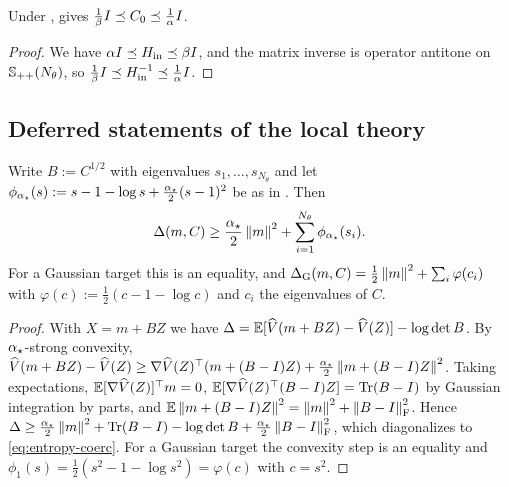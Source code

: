 \begin{lemma}\label{lem:rescue-band}
    Under ,  gives
    $\tfrac1\beta I\preceq C_0\preceq\tfrac1\alpha I$.
\end{lemma}

\begin{proof}
    We have $\alpha I\preceq H_{\mathrm{in}}\preceq\beta I$, and the matrix inverse is
    operator antitone on $\mathbb{S}_{++}(N_\theta)$, so
    $\tfrac1\beta I\preceq H_{\mathrm{in}}^{-1}\preceq\tfrac1\alpha I$.
\end{proof}

\subsection{Deferred statements of the local theory}

\begin{lemma}
\label{lem:coercivity}
Write $B:=C^{1/2}$ with eigenvalues $s_1,\dots,s_{N_\theta}$ and let
$\phi_{\alpha_\star}(s):=s-1-\log s+\tfrac{\alpha_\star}2(s-1)^2$ be as in . Then
\begin{equation}
\label{eq:entropy-coerc}
    \Delta(m,C)\geq\frac{\alpha_\star}2\left\lVert m\right\rVert^2+\sum_{i=1}^{N_\theta}\phi_{\alpha_\star}(s_i).
\end{equation}
For a Gaussian target this is an equality, and
$\Delta_{\mathrm G}(m,C)=\tfrac12\left\lVert m\right\rVert^2+\sum_i\varphi(c_i)$ with
$\varphi(c):=\tfrac12(c-1-\log c)$ and $c_i$ the eigenvalues of $C$.
\end{lemma}

\begin{proof}
With $X=m+BZ$ we have $\Delta=\mathbb{E}[\widehat V(m+BZ)-\widehat V(Z)]-\log\det B$. By
$\alpha_\star$-strong convexity,
$\widehat V(m+BZ)-\widehat V(Z)\geq\nabla\widehat V(Z)^\top(m+(B-I)Z)+\tfrac{\alpha_\star}2\left\lVert m+(B-I)Z\right\rVert^2$.
Taking expectations, $\mathbb{E}[\nabla\widehat V(Z)]^\top m=0$,
$\mathbb{E}[\nabla\widehat V(Z)^\top(B-I)Z]=\operatorname{Tr}(B-I)$ by Gaussian integration by parts, and
$\mathbb{E}\left\lVert m+(B-I)Z\right\rVert^2=\left\lVert m\right\rVert^2+\left\lVert B-I\right\rVert_{\mathrm{F}}^2$. Hence
$\Delta\geq\tfrac{\alpha_\star}2\left\lVert m\right\rVert^2+\operatorname{Tr}(B-I)-\log\det B+\tfrac{\alpha_\star}2\left\lVert B-I\right\rVert_{\mathrm{F}}^2$,
which diagonalizes to \eqref{eq:entropy-coerc}. For a Gaussian target the convexity step is an
equality and $\phi_1(s)=\tfrac12(s^2-1-\log s^2)=\varphi(c)$ with $c=s^2$.
\end{proof}

